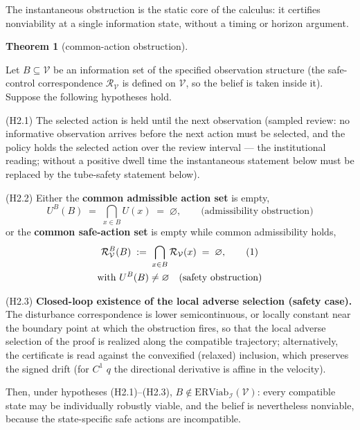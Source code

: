 \documentclass[10pt,twocolumn]{article}
\theoremstyle{definition}
\newtheorem{theorem}{Theorem}
\begin{document}
The instantaneous obstruction is the static core of the calculus: it certifies nonviability at a single information state, without a timing or horizon argument.

\begin{theorem}[common-action obstruction]\label{thm:common-action}

Let \(B \subseteq \mathcal{V}\) be an information set of the specified observation structure (the safe-control correspondence
\(\mathcal{R}_{\mathcal{V}}\) is defined on \(\mathcal{V}\), so the
belief is taken inside it). Suppose the following hypotheses hold.

(H2.1) The selected action is held until the next observation (sampled
review: no informative observation arrives before the next action must
be selected, and the policy holds the selected action over the review
interval --- the institutional reading; without a positive dwell time
the instantaneous statement below must be replaced by the tube-safety statement below).

(H2.2) Either the \textbf{common admissible action set} is empty,
\[U^B(B) \;=\; \bigcap_{x \in B} U(x) \;=\; \varnothing, \qquad \text{(admissibility obstruction)}\]
or the \textbf{common safe-action set} is empty while common
admissibility holds,
\begin{gather}
\mathcal{R}_{\mathcal{V}}^B(B) \;:=\; \bigcap_{x \in B} \mathcal{R}_{\mathcal{V}}(x) \;=\; \varnothing, \tag{1}\\
\text{with } U^B(B) \neq \varnothing \quad \text{(safety obstruction)} \notag
\end{gather}

(H2.3) \textbf{Closed-loop existence of the local adverse selection
(safety case).} The disturbance correspondence is lower semicontinuous,
or locally constant near the boundary point at which the obstruction
fires, so that the local adverse selection of the proof is realized
along the compatible trajectory; alternatively, the certificate is read
against the convexified (relaxed) inclusion, which preserves the
signed drift (for \(C^1\) \(q\) the directional derivative is affine in the velocity).

Then, under hypotheses (H2.1)--(H2.3),
\(B \notin \mathrm{ERViab}_{\mathcal{I}}(\mathcal{V})\): every
compatible state may be individually robustly viable, and the belief is
nevertheless nonviable, because the state-specific safe actions are
incompatible.

\end{theorem}
\end{document}
